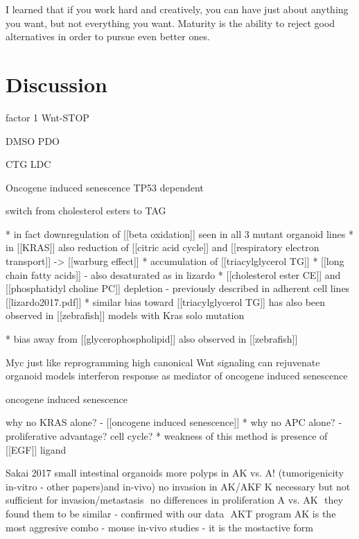 \begin{savequote}[75mm]
I learned that if you work hard and creatively, you can have just about anything you want, but not everything you want. Maturity is the ability to reject good alternatives in order to pursue even better ones.

\end{savequote}

\chapter{Discussion}

factor 1
Wnt-STOP

\label{conclusion}

DMSO
PDO

CTG
LDC

Oncogene induced senescence 
TP53 dependent 



switch from cholesterol esters to TAG 

		* in fact downregulation of [[beta oxidation]] seen in all 3 mutant organoid lines
		* in [[KRAS]] also reduction of [[citric acid cycle]] and [[respiratory electron transport]] -> [[warburg effect]]
		* accumulation of [[triacylglycerol TG]]
			* [[long chain fatty acids]] - also desaturated as in lizardo
			* [[cholesterol ester CE]] and [[phosphatidyl choline PC]] depletion - previously described in adherent cell lines [[lizardo2017.pdf]]
			* similar bias toward [[triacylglycerol TG]] has also been observed in [[zebrafish]] models with Kras solo mutation


	* bias away from [[glycerophospholipid]] also observed in [[zebrafish]]



Myc 
just like reprogramming
high canonical Wnt signaling can rejuvenate organoid models
interferon response as mediator of oncogene induced senescence

oncogene induced senescence

 why no KRAS alone? - [[oncogene induced senescence]]
* why no APC alone? - proliferative advantage? cell cycle? 
	* weakness of this method is presence of [[EGF]] ligand

Sakai 2017
small intestinal organoids more polyps in AK vs. A! (tumorigenicity in-vitro - other papers)and in-vivo) no invasion in AK/AKF K necessary but not sufficient for invasion/metastasis  no differences in proliferation A vs. AK  they found them to be similar - confirmed with our data  AKT program AK is the most aggresive combo - mouse in-vivo studies - it is the mostactive form

